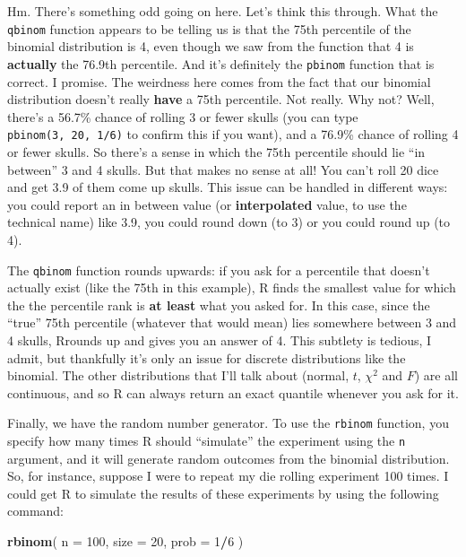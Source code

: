 \documentclass[
]{book}
\newenvironment{Shaded}{\begin{snugshade}}{\end{snugshade}}
\newcommand{\DataTypeTok}[1]{\textcolor[rgb]{0.13,0.29,0.53}{#1}}
\newcommand{\DecValTok}[1]{\textcolor[rgb]{0.00,0.00,0.81}{#1}}
\newcommand{\KeywordTok}[1]{\textcolor[rgb]{0.13,0.29,0.53}{\textbf{#1}}}
\newcommand{\NormalTok}[1]{#1}
\newcommand{\OperatorTok}[1]{\textcolor[rgb]{0.81,0.36,0.00}{\textbf{#1}}}
\begin{document}
Hm. There's something odd going on here. Let's think this through. What the \texttt{qbinom} function appears to be telling us is that the 75th percentile of the binomial distribution is 4, even though we saw from the function that 4 is \textbf{actually} the 76.9th percentile. And it's definitely the \texttt{pbinom} function that is correct. I promise. The weirdness here comes from the fact that our binomial distribution doesn't really \textbf{have} a 75th percentile. Not really. Why not? Well, there's a 56.7\% chance of rolling 3 or fewer skulls (you can type \texttt{pbinom(3,\ 20,\ 1/6)} to confirm this if you want), and a 76.9\% chance of rolling 4 or fewer skulls. So there's a sense in which the 75th percentile should lie ``in between'' 3 and 4 skulls. But that makes no sense at all! You can't roll 20 dice and get 3.9 of them come up skulls. This issue can be handled in different ways: you could report an in between value (or \textbf{interpolated} value, to use the technical name) like 3.9, you could round down (to 3) or you could round up (to 4).

The \texttt{qbinom} function rounds upwards: if you ask for a percentile that doesn't actually exist (like the 75th in this example), R finds the smallest value for which the the percentile rank is \textbf{at least} what you asked for. In this case, since the ``true'' 75th percentile (whatever that would mean) lies somewhere between 3 and 4 skulls, Rrounds up and gives you an answer of 4. This subtlety is tedious, I admit, but thankfully it's only an issue for discrete distributions like the binomial. The other distributions that I'll talk about (normal, \(t\), \(\chi^2\) and \(F\)) are all continuous, and so R can always return an exact quantile whenever you ask for it.

Finally, we have the random number generator. To use the \texttt{rbinom} function, you specify how many times R should ``simulate'' the experiment using the \texttt{n} argument, and it will generate random outcomes from the binomial distribution. So, for instance, suppose I were to repeat my die rolling experiment 100 times. I could get R to simulate the results of these experiments by using the following command:

\begin{Shaded}
\begin{Highlighting}[]
\KeywordTok{rbinom}\NormalTok{( }\DataTypeTok{n =} \DecValTok{100}\NormalTok{, }\DataTypeTok{size =} \DecValTok{20}\NormalTok{, }\DataTypeTok{prob =} \DecValTok{1}\OperatorTok{/}\DecValTok{6}\NormalTok{ )}
\end{Highlighting}
\end{Shaded}
\end{document}
